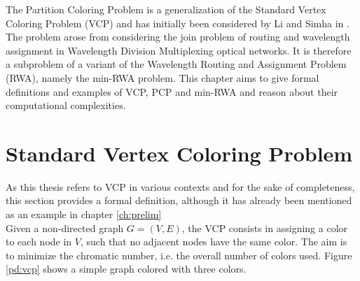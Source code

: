 
The Partition Coloring Problem is a generalization of the Standard Vertex Coloring Problem (VCP) and has initially been considered by Li and Simha in \cite{li-00}. The problem arose from considering the join problem of routing and wavelength assignment in Wavelength Division Multiplexing optical networks. It is therefore a subproblem of a variant of the Wavelength Routing and Assignment Problem (RWA), namely the min-RWA problem. This chapter aims to give formal definitions and examples of VCP, PCP and min-RWA and reason about their computational complexities.

\section{Standard Vertex Coloring Problem}
As this thesis refers to VCP in various contexts and for the sake of completeness, this section provides a formal definition, although it has already been mentioned as an example in chapter \ref{ch:prelim} \\
Given a non-directed graph $G=(V,E)$, the VCP consists in assigning a color to each node in $V$, such that no adjacent nodes have the same color. The aim is to minimize the chromatic number, i.e. the overall number of colors used. Figure \ref{pd:vcp} shows a simple graph colored with three colors.

